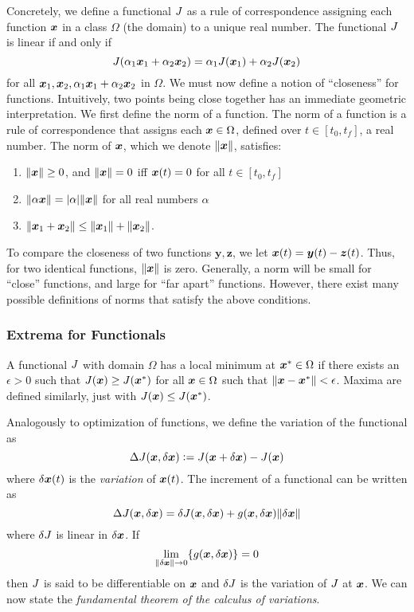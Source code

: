 Concretely, we define a functional $J$ as a rule of correspondence assigning each function $\bm{x}$ in a class $\Omega$ (the domain) to a unique real number. The functional $J$ is linear if and only if 
\begin{equation}
    J(\alpha_1 \bm{x}_1 + \alpha_2 \bm{x}_2) = \alpha_1 J(\bm{x}_1) + \alpha_2 J(\bm{x}_2)
\end{equation}
for all $\bm{x}_1, \bm{x}_2, \alpha_1 \bm{x}_1 + \alpha_2 \bm{x}_2$ in $\Omega$. We must now define a notion of ``closeness'' for functions. Intuitively, two points being close together has an immediate geometric interpretation. We first define the norm of a function. The norm of a function is a rule of correspondence that assigns each $\bm{x} \in \Omega$, defined over $t \in [t_0,t_f]$, a real number. The norm of $\bm{x}$, which we denote $\|\bm{x}\|$, satisfies:
\begin{enumerate}
    \item $\|\bm{x}\| \geq 0$, and $\|\bm{x}\|=0$ iff $\bm{x}(t) = 0$ for all $t \in [t_0,t_f]$
    \item $\|\alpha \bm{x}\| = |\alpha| \|\bm{x}\|$ for all real numbers $\alpha$
    \item $\|\bm{x}_1 + \bm{x}_2\| \leq \|\bm{x}_1\| + \|\bm{x}_2\|$.
\end{enumerate}
To compare the closeness of two functions $\bm{y}, \bm{z}$, we let $\bm{x}(t) = \bm{y}(t) - \bm{z}(t)$. Thus, for two identical functions, $\|\bm{x}\|$ is zero. Generally, a norm will be small for ``close'' functions, and large for ``far apart'' functions. However, there exist many possible definitions of norms that satisfy the above conditions. 

\subsubsection{Extrema for Functionals}

A functional $J$ with domain $\Omega$ has a local minimum at $\bm{x}^* \in \Omega$ if there exists an $\epsilon > 0$ such that $J(\bm{x}) \geq J(\bm{x}^*)$ for all $\bm{x} \in \Omega$ such that $\|\bm{x} - \bm{x}^*\| < \epsilon$. Maxima are defined similarly, just with $J(\bm{x}) \leq J(\bm{x}^*)$. 

Analogously to optimization of functions, we define the variation of the functional as
\begin{equation}
    \Delta J(\bm{x},\delta \bm{x}) \vcentcolon= J(\bm{x} + \delta \bm{x}) - J(\bm{x})
\end{equation}
where $\delta \bm{x}(t)$ is the \textit{variation} of $\bm{x}(t)$. The increment of a functional can be written as 
\begin{equation}
    \Delta J(\bm{x},\delta \bm{x}) = \delta J(\bm{x},\delta \bm{x}) + g(\bm{x},\delta \bm{x}) \|\delta \bm{x}\|
\end{equation}
where $\delta J$ is linear in $\delta \bm{x}$. If 
\begin{equation}
    \lim_{\|\delta \bm{x} \| \to 0} \{g(\bm{x},\delta \bm{x})\} = 0
\end{equation}
then $J$ is said to be differentiable on $\bm{x}$ and $\delta J$ is the variation of $J$ at $\bm{x}$. 
We can now state the \textit{fundamental theorem of the calculus of variations}. 

